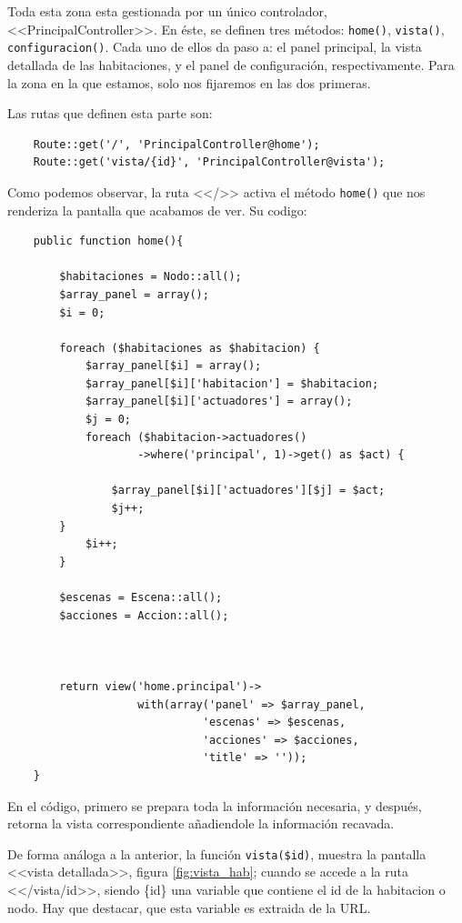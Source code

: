    Toda esta zona esta gestionada por un único controlador, <<PrincipalController>>. En éste, se definen tres métodos: \lstinline|home()|,  \lstinline|vista()|, \lstinline|configuracion()|. Cada uno de ellos da paso a: el panel principal, la vista detallada de las habitaciones, y el panel de configuración, respectivamente. Para la zona en la que estamos, solo nos fijaremos en las dos primeras.
    
    Las rutas que definen esta parte son:
    \begin{lstlisting}
    Route::get('/', 'PrincipalController@home');
    Route::get('vista/{id}', 'PrincipalController@vista');
    \end{lstlisting}
    
    Como podemos observar, la ruta <</>> activa el método \lstinline|home()| que nos renderiza la pantalla que acabamos de ver. Su codigo:
    \begin{lstlisting}
    public function home(){
    
        $habitaciones = Nodo::all();
        $array_panel = array();
        $i = 0;
        
        foreach ($habitaciones as $habitacion) {
            $array_panel[$i] = array();
            $array_panel[$i]['habitacion'] = $habitacion;
            $array_panel[$i]['actuadores'] = array();
            $j = 0;
            foreach ($habitacion->actuadores()
                    ->where('principal', 1)->get() as $act) {
                    
                $array_panel[$i]['actuadores'][$j] = $act;
                $j++;
        }
            $i++;
        }
        
        $escenas = Escena::all();
        $acciones = Accion::all();
        
        
        
        return view('home.principal')->
                    with(array('panel' => $array_panel,
                              'escenas' => $escenas,
                              'acciones' => $acciones,
                              'title' => ''));
    }
    \end{lstlisting}
    
    En el código, primero se prepara toda la información necesaria, y después, retorna la vista correspondiente añadiendole la información recavada.
    
    De forma análoga a la anterior, la función \lstinline|vista($id)|, muestra la pantalla <<vista detallada>>, figura \ref{fig:vista_hab}; cuando se accede a la ruta <</vista/{id}>>, siendo \{id\} una variable que contiene el id de la habitacion o nodo. Hay que destacar, que esta variable es extraida de la URL.
    
